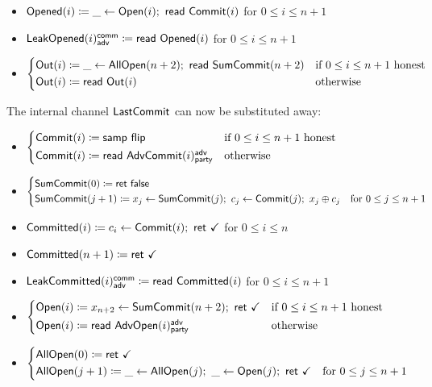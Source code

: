 \begin{itemize}
\item {\color{red} $\mathsf{Opened}(i) \coloneqq \_ \leftarrow \mathsf{Open}(i); \ \mathsf{read} \ \mathsf{Commit}(i)$ for $0 \leq i \leq n+1$}
\item {\color{red} $\mathsf{LeakOpened}(i)^{\mathsf{comm}}_{\mathsf{adv}} \coloneqq \mathsf{read} \ \mathsf{Opened}(i)$ for $0 \leq i \leq n+1$}
\item $\begin{cases*} \Out(i) \coloneqq \_ \leftarrow \AllOpen(n+2); \ \read{\SumCommit(n+2)} & \text{if $0 \leq i \leq n+1$ honest} \\ \Out(i) \coloneqq \read{\Out(i)} & \text{otherwise} \end{cases*}$
\end{itemize}

\noindent The internal channel $\mathsf{LastCommit}$ can now be substituted away:
\begin{itemize}
\item {\color{blue} $\begin{cases*} \Commit(i) \coloneqq \samp{\flip} & \text{if $0 \leq i \leq n+1$ honest} \\ \Commit(i) \coloneqq \read{\AdvCommit(i)^\adv_\party} & \text{otherwise} \end{cases*}$}
\item {\color{blue} $\begin{cases*} \SumCommit(0) \coloneqq \ret{\false} & \\ \SumCommit(j+1) \coloneqq x_j \leftarrow \SumCommit(j); \ c_j \leftarrow \Commit(j); \ x_j \oplus c_j & \text{for $0 \leq j \leq n+1$} \end{cases*}$}
\item {\color{magenta} $\mathsf{Committed}(i) \coloneqq c_i \leftarrow \mathsf{Commit}(i); \ \mathsf{ret} \ \checkmark$ for $0 \leq i \leq n$}
\item {\color{magenta} $\mathsf{Committed}(n+1) \coloneqq \mathsf{ret} \ \checkmark$}
\item {\color{magenta} $\mathsf{LeakCommitted}(i)^{\mathsf{comm}}_{\mathsf{adv}} \coloneqq \mathsf{read} \ \mathsf{Committed}(i)$ for $0 \leq i \leq n+1$}
\item {\color{teal} $\begin{cases*} \Open(i) \coloneqq x_{n+2} \leftarrow \SumCommit(n+2); \ \ret{\checkmark} & \text{if $0 \leq i \leq n+1$ honest} \\ \Open(i) \coloneqq \read{\AdvOpen(i)^\adv_\party} & \text{otherwise} \end{cases*}$}
\item {\color{teal} $\begin{cases*} \AllOpen(0) \coloneqq \ret{\checkmark} & \\ \AllOpen(j+1) \coloneqq \_ \leftarrow \AllOpen(j); \ \_ \leftarrow \Open(j); \ \ret{\checkmark} & \text{for $0 \leq j \leq n+1$} \end{cases*}$}

\end{itemize}
